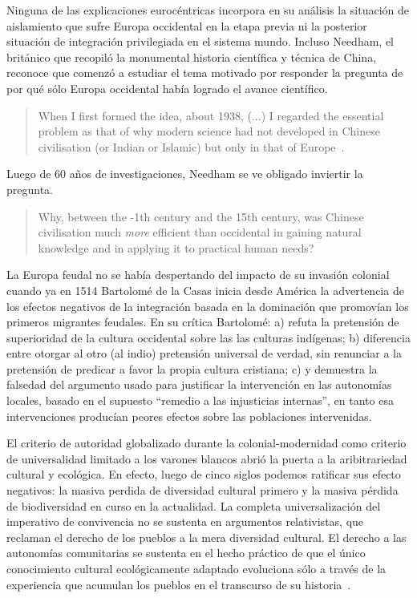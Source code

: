 \documentclass[a4paper,10pt]{book}
\begin{document}

Ninguna de las explicaciones eurocéntricas incorpora en su análisis la situación de aislamiento que sufre Europa occidental en la etapa previa ni la posterior situación de integración privilegiada en el sistema mundo.
Incluso Needham, el británico que recopiló la monumental historia científica y técnica de China, reconoce que comenzó a estudiar el tema motivado por responder la pregunta de por qué sólo Europa occidental había logrado el avance científico.
\begin{quotation}
When I first formed the idea, about 1938, (...) I regarded the essential problem as that of why modern science had not developed in Chinese civilisation (or Indian or Islamic) but only in that of Europe~\cite{needham2004-generalConclusionsAndReflections}.%
\end{quotation}
Luego de 60 años de investigaciones, Needham se ve obligado inviertir la pregunta.
\begin{quotation}
Why, between the -1th century and the 15th century, was Chinese civilisation much \emph{more} efficient than occidental in gaining natural knowledge and in applying it to practical human needs?~\cite{needham2004-generalConclusionsAndReflections}
\end{quotation}


La Europa feudal no se había despertando del impacto de su invasión colonial cuando ya en 1514 Bartolomé de la Casas inicia desde América la advertencia de los efectos negativos de la integración basada en la dominación que promovían los primeros migrantes feudales.
En su crítica Bartolomé:
a) refuta la pretensión de superioridad de la cultura occidental sobre las las culturas indígenas;
b) diferencia entre otorgar al otro (al indio) pretensión universal de verdad, sin renunciar a la pretensión de predicar a favor la propia cultura cristiana;
c) y demuestra la falsedad del argumento usado para justificar la intervención en las autonomías locales, basado en el supuesto ``remedio a las injusticias internas'', en tanto esa intervenciones producían peores efectos sobre las poblaciones intervenidas.


El criterio de autoridad globalizado durante la colonial-modernidad como criterio de universalidad limitado a los varones blancos abrió la puerta a la aribitrariedad cultural y ecológica.
En efecto, luego de cinco siglos podemos ratificar sus efecto negativos: la masiva perdida de diversidad cultural primero y la masiva pérdida de biodiversidad en curso en la actualidad.
La completa universalización del imperativo de convivencia no se sustenta en argumentos relativistas, que reclaman el derecho de los pueblos a la mera diversidad cultural.
El derecho a las autonomías comunitarias se sustenta en el hecho práctico de que el único conocimiento cultural ecológicamente adaptado evoluciona sólo a través de la experiencia que acumulan los pueblos en el transcurso de su historia~\cite{Rita}.
\end{document}
